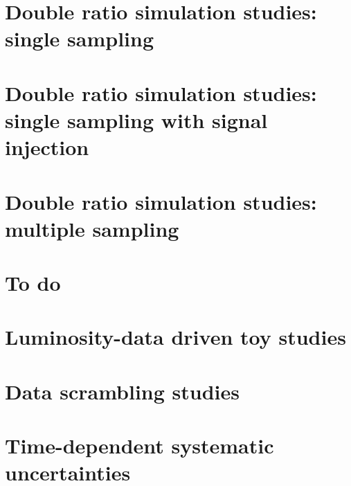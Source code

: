 \documentclass[NOTE, atlasdraft=true, texlive=2016, UKenglish]{atlasdoc}
\begin{document}
\clearpage
\section{Double ratio simulation studies: single sampling}
\label{sec:double_ratio}


\clearpage
\section{Double ratio simulation studies: single sampling with signal injection}
\label{sec:double_ratio_injection_studies}


\clearpage
\section{Double ratio simulation studies: multiple sampling}
\label{sec:double_ratio_multiple}


\clearpage
\section{To do}


\clearpage
\section{Luminosity-data driven toy studies}  %
\label{lab:ToyStudy}
%

\clearpage
\section{Data scrambling studies} %
\label{lab:DataScrambling}


\clearpage
\section{Time-dependent systematic uncertainties} %
%
%
%
%
\end{document}
